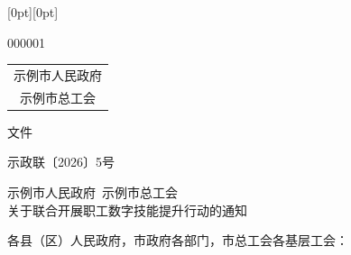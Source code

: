 \documentclass[linespread=1.81, twoside]{ctexart}
\begin{document}
\noindent\raisebox{0pt}[0pt][0pt]{\parbox[t]{\textwidth}{%
  000001\\                        %
  \mbox{}}}\par
\vspace*{\dimexpr\gwlogodrop-\topskip-\baselineskip+5.9mm\relax}
{\centering{}\xbsong\color{gwred}%
 \renewcommand{\arraystretch}{0.72}%
 \begin{tabular}{@{}c@{}}示例市人民政府\\示例市总工会\end{tabular}\hspace{0.4\ccwd}文件\par}
\nointerlineskip
\vspace{\dimexpr 2\baselineskip-6.5mm\relax}
{\centering 示政联〔2026〕5号\par}
\nointerlineskip
\vspace{4mm}
\noindent{\color{gwred}\rule{\textwidth}{\gwredrule}}\par
\nointerlineskip

\vspace{\dimexpr 2\baselineskip-4mm\relax}
{\centering{}\xbsong\baselineskip=30bp
 示例市人民政府\ 示例市总工会\\关于联合开展职工数字技能提升行动的通知\par}
\nointerlineskip
\par\nointerlineskip
\vspace{\baselineskip}
\noindent 各县（区）人民政府，市政府各部门，市总工会各基层工会：
\end{document}

